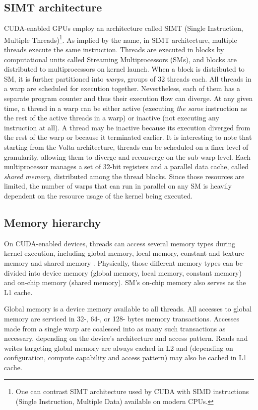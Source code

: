 \subsection{SIMT architecture}
CUDA-enabled GPUs employ an architecture called SIMT (Single Instruction,
Multiple Threads)\footnote{One can contrast SIMT architecture used by CUDA with
  SIMD instructions (Single Instruction, Multiple Data) available on modern
  CPUs.}. As implied by the name, in SIMT architecture, multiple threads execute
the same instruction. Threads are executed in blocks by computational units
called Streaming Multiprocessors (SMs), and blocks are distributed to
multiprocessors on kernel launch. When a block is distributed to SM, it is
further partitioned into \emph{warps}, groups of 32 threads each. All threads
in a warp are scheduled for execution together. Nevertheless, each of them has
a separate program counter and thus their execution flow can diverge. At any
given time, a thread in a warp can be either active (executing \emph{the same}
instruction as the rest of the active threads in a warp) or inactive (not
executing any instruction at all). A thread may be inactive because its
execution diverged from the rest of the warp or because it terminated earlier.
It is interesting to note that starting from the Volta architecture, threads
can be scheduled on a finer level of granularity, allowing them to diverge and
reconverge on the sub-warp level. Each multiprocessor manages a set of 32-bit
registers and a parallel data cache, called \emph{shared memory}, distributed
among the thread blocks. Since those resources are limited, the number of warps
that can run in parallel on any SM is heavily dependent on the resource usage
of the kernel being executed.

\subsection{Memory hierarchy}

On CUDA-enabled devices, threads can access several memory types during kernel
execution, including global memory, local memory, constant and texture memory
and shared memory \cite{CUDAguide}. Physically, those different memory types
can be divided into device memory (global memory, local memory, constant
memory) and on-chip memory (shared memory). SM's on-chip memory also serves as
the L1 cache.

Global memory is a device memory available to all threads. All accesses to
global memory are serviced in 32-, 64-, or 128- bytes memory transactions.
Accesses made from a single warp are coalesced into as many such transactions
as necessary, depending on the device's architecture and access pattern. Reads
and writes targeting global memory are always cached in L2 and (depending on
configuration, compute capability and access pattern) may also be cached in L1
cache.

